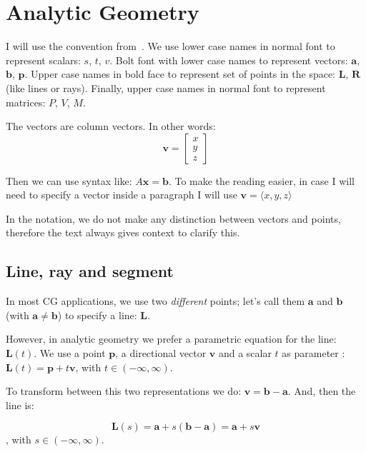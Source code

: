 \section{Analytic Geometry}
\label{sec:analyticGeo}

I will use the convention from~\cite{Buss2003}.
We use lower case names in normal font to represent scalars: $s$, $t$, $v$.
Bolt font with lower case names to represent vectors: $\mathbf{a}$, $\mathbf{b}$, $\mathbf{p}$.
Upper case names in bold face to represent set of points in the space: $\mathbf{L}$, $\mathbf{R}$ (like lines or rays).
Finally, upper case names in normal font to represent matrices: $P$, $V$, $M$.

The vectors are column vectors. In other words:
$$ \mathbf{v} = \begin{bmatrix}
  x \\ 
  y \\
  z
 \end{bmatrix} $$

Then we can use syntax like: $A \mathbf{x} = \mathbf{b}$.
To make the reading easier, in case I will need to specify a vector inside a paragraph I will use $\mathbf{v} = \langle x, y, z \rangle$

In the notation, we do not make any distinction between vectors and points, therefore the text always gives context to clarify this. 

\subsection{Line, ray and segment}
\label{sec:linedef}

In most CG applications, we use two \emph{different} points; let's call them $\mathbf{a}$ and $\mathbf{b}$ (with $\mathbf{a} \neq \mathbf{b}$) to specify a line: $\mathbf{L}$. 

However, in analytic geometry we prefer a parametric equation for the line: $\mathbf{L}(t)$.
We use a point $\mathbf{p}$, a directional vector $\mathbf{v}$ and a scalar $t$ as parameter : $\mathbf{L}(t) = \mathbf{p} + t \mathbf{v}$, with $t \in (-\infty, \infty)$.

To transform between this two representations we do: $\mathbf{v} = \mathbf{b} -\mathbf{a}$. And, then the line is: 

\begin{equation}
\mathbf{L}(s) = \mathbf{a} + s (\mathbf{b} -\mathbf{a}) = \mathbf{a} + s \mathbf{v} 
\label{eq:line}
\end{equation}
, with $s \in (-\infty, \infty)$. 

